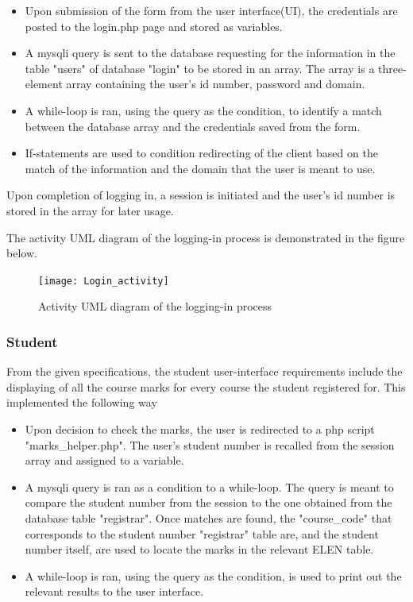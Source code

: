 \begin{itemize}
\item Upon submission of the form from the user interface(UI), the credentials are posted to the login.php page and stored as variables.
\item A mysqli query is sent to the database requesting for the information in the table "users" of database "login" to be stored in an array. The array is a three-element array containing the user's id number, password and domain.
\item A while-loop is ran, using the query as the condition, to identify a match between the database array and the credentials saved from the form.
\item If-statements are used to condition redirecting of the client based on the match of the information and the domain that the user is meant to use.
\end{itemize}

Upon completion of logging in, a session is initiated and the user's id number is stored in the array for later usage.

The activity UML diagram of the logging-in process is demonstrated in the figure below.

\begin{center}
	\begin{figure}[h]
		\centering
		\texttt{[image: Login\_activity]}
		\caption{Activity UML diagram of the logging-in process}
	\end{figure}
\end{center} 

\subsubsection{Student}
From the given specifications, the student user-interface requirements include the displaying of all the course marks for every course the student registered for. This implemented the following way

\begin{itemize}
	\item Upon decision to check the marks, the user is redirected to a php script "marks\_helper.php". The user's student number is recalled from the session array and assigned to a variable.
	
	\item A mysqli query is ran as a condition to a while-loop. The query is meant to compare the student number from the session to the one obtained from the database table "registrar". Once matches are found, the "course\_code" that corresponds to the student number "registrar" table are, and the student number itself, are used to locate the marks in the relevant ELEN table.
	
	\item A while-loop is ran, using the query as the condition, is used to print out the relevant results to the user interface.
\end{itemize}


